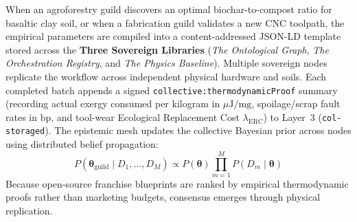 When an agroforestry guild discovers an optimal biochar-to-compost ratio for basaltic clay soil, or when a fabrication guild validates a new CNC toolpath, the empirical parameters are compiled into a content-addressed JSON-LD template stored across the \textbf{Three Sovereign Libraries} (\textit{The Ontological Graph}, \textit{The Orchestration Registry}, and \textit{The Physics Baseline}). Multiple sovereign nodes replicate the workflow across independent physical hardware and soils. Each completed batch appends a signed \texttt{collective:thermodynamicProof} summary (recording actual exergy consumed per kilogram in $\mu\mathrm{J/mg}$, spoilage/scrap fault rates in $\mathrm{bp}$, and tool-wear Ecological Replacement Cost $\lambda_{\mathrm{ERC}}$) to Layer~3 (\texttt{col-storaged}). The epistemic mesh updates the collective Bayesian prior across nodes using distributed belief propagation:
\begin{equation}
P(\mathbf{\theta}_{\mathrm{guild}} \mid D_1, \dots, D_M) \propto P(\mathbf{\theta}) \prod_{m=1}^M P(D_m \mid \mathbf{\theta})
\label{eq:distributed_bayesian_consensus}
\end{equation}
Because open-source franchise blueprints are ranked by empirical thermodynamic proofs rather than marketing budgets, consensus emerges through physical replication.

